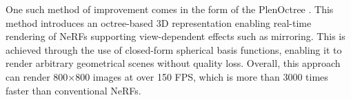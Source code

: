 One such method of improvement comes in the form of the PlenOctree \cite{Yu21plenoctrees}. This method introduces an octree-based 3D representation enabling real-time rendering of NeRFs supporting view-dependent effects such as mirroring. This is achieved through the use of closed-form spherical basis functions, enabling it to render arbitrary geometrical scenes without quality loss. Overall, this approach can render 800×800 images at over 150 FPS, which is more than 3000 times faster than conventional NeRFs.